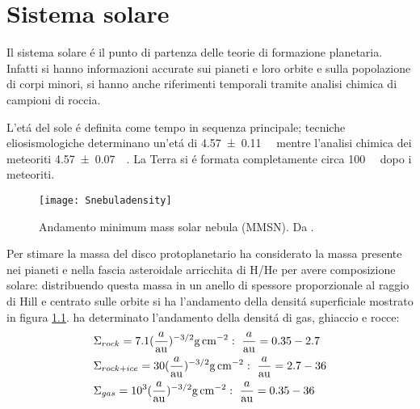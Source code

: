 
{\let\clearpage\relax\let\cleardoublepage\relax
\chapter{Sistema solare}
}
Il sistema solare \'e il punto di partenza delle teorie di formazione planetaria. Infatti si hanno informazioni accurate sui pianeti e loro orbite e sulla popolazione di corpi minori, si hanno anche riferimenti temporali tramite analisi chimica di campioni di roccia.

L'et\'a del sole \'e definita come tempo in sequenza principale; tecniche eliosismologiche determinano un'et\'a di \SI{4.57+-0.11}{\giga\year} mentre l'analisi chimica dei meteoriti \SI{4.57+-0.07}{\giga\year}.
La Terra si \'e formata completamente circa \SI{100}{\mega\year} dopo i meteoriti.

\begin{figure}[!ht]
\texttt{[image: Snebuladensity]}\caption{Andamento minimum mass solar nebula (MMSN). Da \cite{weidenschilling1977distribution}.}\label{fig:Snebuladensity}
\end{figure}

Per stimare la massa del disco protoplanetario \cite{weidenschilling1977distribution} ha considerato la massa presente nei pianeti e nella fascia asteroidale arricchita di H/He per avere composizione solare: distribuendo questa massa in un anello di spessore proporzionale al raggio di Hill e centrato sulle orbite si ha l'andamento della densit\'a superficiale mostrato in figura \ref{fig:Snebuladensity}. \cite{hayashi1981structure} ha determinato l'andamento della densit\'a di gas, ghiaccio e rocce:
\begin{align}
&\Sigma_{rock}=7.1(\frac{a}{\si{\astronomicalunit}})\expy{-3/2}\si{\gram\per\square\cm}:\ \frac{a}{\si{\astronomicalunit}}=0.35-2.7\\
&\Sigma_{rock+ice}=30(\frac{a}{\si{\astronomicalunit}})\expy{-3/2}\si{\gram\per\square\cm}:\ \frac{a}{\si{\astronomicalunit}}=2.7-36\\
&\Sigma_{gas}=\num{e3}(\frac{a}{\si{\astronomicalunit}})\expy{-3/2}\si{\gram\per\square\cm}:\ \frac{a}{\si{\astronomicalunit}}=0.35-36
\end{align}

\begin{workout}

\end{workout}

